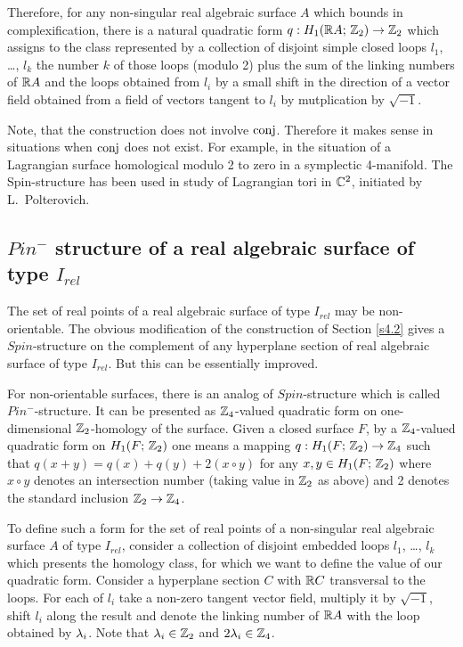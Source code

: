 \documentclass{article}
\numberwithin{equation}{section}
\begin{document}
Therefore, for any non-singular real algebraic surface $A$ which bounds
in complexification, there is a natural quadratic form
$q:H_1(\mathbb R A;\,\mathbb Z_2)\to\mathbb Z_2$ which assigns to the class represented by a
collection of disjoint simple closed loops $l_1$, \dots, $l_k$ the
number $k$ of those loops (modulo 2) plus the sum of the linking
numbers of $\mathbb R A$ and the loops obtained from $l_i$ by a small shift
in the direction of a vector field obtained from a field of vectors
tangent to $l_i$ by mutplication by $\sqrt{-1}$.

Note, that the construction does not involve $\operatorname{conj}$. Therefore it
makes sense in situations when $\operatorname{conj}$ does not exist. For example, in
the situation of a Lagrangian surface homological modulo 2 to zero in
a symplectic 4-manifold. The Spin-structure has been used in study of
Lagrangian tori in $\mathbb C^2$, initiated by L.~Polterovich.

\subsection{$Pin^-$ structure of a real algebraic surface of type
$I_{rel}$ }\label{s4.3} 
The set of real points of a real algebraic surface of type
$I_{rel}$ may be non-orientable. The obvious modification of the
construction of Section \ref{s4.2} gives a $Spin$-structure on the complement
of any hyperplane section of real algebraic surface of type $I_{rel}$.
But this can be essentially improved.

For non-orientable surfaces, there is an analog of $Spin$-structure
which is called
 $Pin^-$-structure. It can be presented as $\mathbb Z_4$-valued
quadratic form on one-dimensional $\mathbb Z_2$-homology of the surface. Given
a closed surface $F$, by a $\mathbb Z_4$-valued quadratic form on
$H_1(F;\,\mathbb Z_2)$ one means a mapping $q:H_1(F;\,\mathbb Z_2)\to\mathbb Z_4$ such that
$q(x+y)=q(x)+q(y)+2(x\circ y)$ for any $x,y \in H_1(F;\,\mathbb Z_2)$ where
$x\circ y$ denotes an intersection number (taking value in $\mathbb Z_2$ as
above) and 2 denotes the standard inclusion $\mathbb Z_2\to\mathbb Z_4$.

To define such a form for the set of real points of a non-singular real
algebraic surface $A$ of type $I_{rel}$, consider a collection of
disjoint embedded loops $l_1$, \dots, $l_k$ which presents the homology
class, for which we want to define the value of our quadratic form.
Consider a hyperplane section $C$ with $\mathbb R C$ transversal to the loops.
For each of $l_i$ take a non-zero tangent vector field, multiply it by
$\sqrt{-1}$, shift $l_i$ along the result and denote the linking number
of $\mathbb R A$ with the loop obtained by $\lambda_i$. Note that $\lambda_i\in \mathbb Z_2$
and $2\lambda_i\in\mathbb Z_4$.
\end{document}
